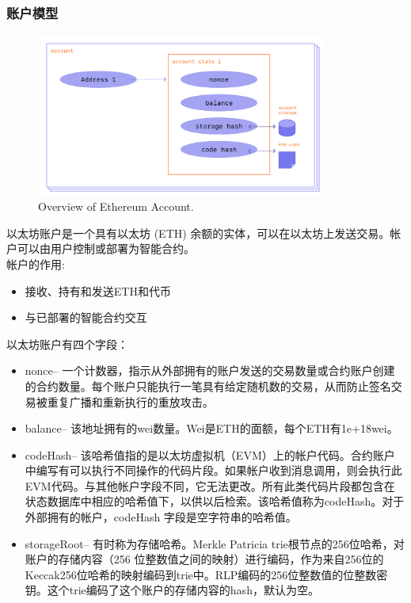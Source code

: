 \documentclass{article}
\begin{document}
\subsubsection{账户模型}
\begin{figure}[h]
\centering
\includegraphics[width=0.85\textwidth]{account.png}
\caption{\label{fig:account}Overview of Ethereum Account.}
\end{figure}
\par 以太坊账户是一个具有以太坊 (ETH) 余额的实体，可以在以太坊上发送交易。帐户可以由用户控制或部署为智能合约。\\
帐户的作用:
\begin{itemize}
    \item 接收、持有和发送ETH和代币
    \item 与已部署的智能合约交互
\end{itemize}
以太坊账户有四个字段：
\begin{itemize}
    \item nonce– 一个计数器，指示从外部拥有的账户发送的交易数量或合约账户创建的合约数量。每个账户只能执行一笔具有给定随机数的交易，从而防止签名交易被重复广播和重新执行的重放攻击。
    \item balance– 该地址拥有的wei数量。Wei是ETH的面额，每个ETH有1e+18wei。
    \item codeHash– 该哈希值指的是以太坊虚拟机（EVM）上的帐户代码。合约账户中编写有可以执行不同操作的代码片段。如果帐户收到消息调用，则会执行此EVM代码。与其他帐户字段不同，它无法更改。所有此类代码片段都包含在状态数据库中相应的哈希值下，以供以后检索。该哈希值称为codeHash。对于外部拥有的帐户，codeHash 字段是空字符串的哈希值。
    \item storageRoot– 有时称为存储哈希。Merkle Patricia trie根节点的256位哈希，对账户的存储内容（256 位整数值之间的映射）进行编码，作为来自256位的Keccak256位哈希的映射编码到trie中。RLP编码的256位整数值的位整数密钥。这个trie编码了这个账户的存储内容的hash，默认为空。
\end{itemize}
\end{document}
